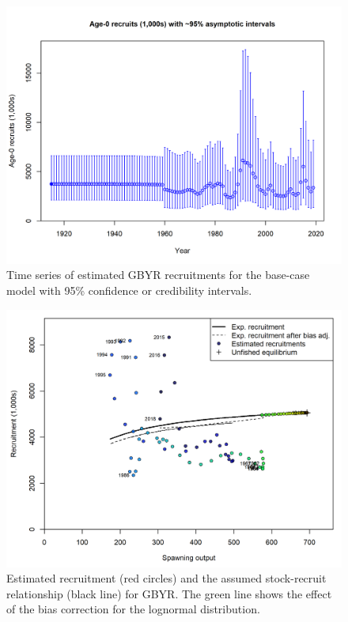 \documentclass[12pt,]{article}
\begin{document}
\FloatBarrier

\begin{figure}
\centering
\includegraphics{r4ss/plots_mod1/ts11_Age-0_recruits_(1000s)_with_95_asymptotic_intervals.png}
\caption{Time series of estimated GBYR recruitments for the base-case
model with 95\% confidence or credibility intervals.
\label{fig:Recruit_mod1}}
\end{figure}

\begin{figure}
\centering
\includegraphics{r4ss/plots_mod1/SR_curve2.png}
\caption{Estimated recruitment (red circles) and the assumed
stock-recruit relationship (black line) for GBYR. The green line shows
the effect of the bias correction for the lognormal distribution.
\label{fig:SR_curve2}}
\end{figure}
\end{document}
